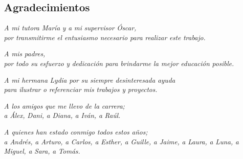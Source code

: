 \vspace*{5em}

\begin{center}
    \section*{Agradecimientos}
    
        \begin{adjustwidth}{-1pt}{-1pt}
             \begin{flushright}
                \textit{A mi tutora María y a mi supervisor Óscar,
                \\
                por transmitirme el entusiasmo necesario para realizar este trabajo.}
            \end{flushright}
        
            \vspace{1cm}
        
            \begin{flushright}
                \textit{A mis padres,
                \\
                por todo su esfuerzo y dedicación para brindarme la mejor educación posible.}
            \end{flushright}
            
            \vspace{1cm}
            
            \begin{flushright}
                \textit{A mi hermana Lydia por su siempre desinteresada ayuda 
                \\
                para ilustrar o referenciar mis trabajos y proyectos.}
            \end{flushright}
            
            \vspace{1cm}
            
            \begin{flushright}
                \textit{A los amigos que me llevo de la carrera;
                \\
                a Álex, Dani, a Diana, a Iván, a Raúl.}
            \end{flushright}
            
            \vspace{1cm}
            
            \begin{flushright}
                \textit{A quienes han estado conmigo todos estos años;
                \\
                \small{a Andrés, a Arturo, a Carlos, a Esther, a Guille, a Jaime, a Laura, a Luna, a Miguel, a Sara, a Tomás.}}
            \end{flushright}
            

\end{adjustwidth}
\end{center}
